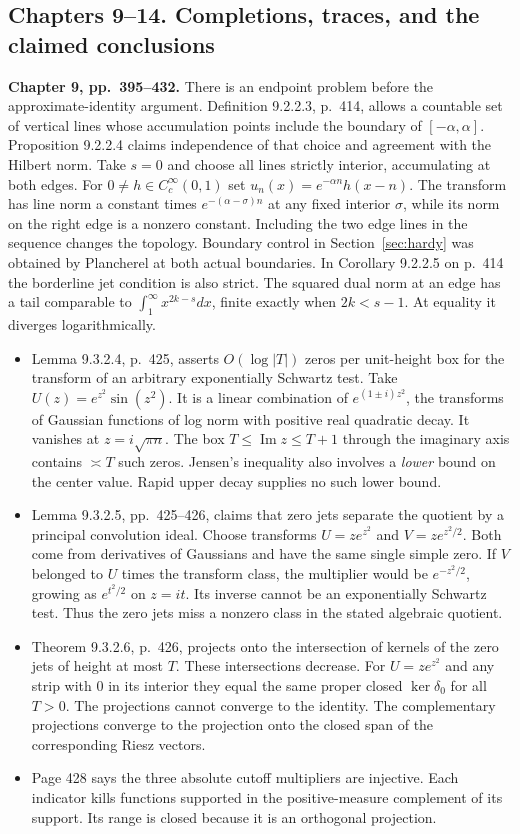 \documentclass[11pt,letterpaper]{article}
\newcommand{\im}{\operatorname{Im}}
\newcommand{\head}[1]{\par\smallskip\textbf{#1}\enspace}
\begin{document}
\subsection*{Chapters 9--14. Completions, traces, and the claimed conclusions}

\head{Chapter 9, pp.~395--432.}
There is an endpoint problem before the approximate-identity argument. Definition 9.2.2.3, p.~414, allows a countable set of vertical lines whose accumulation points include the boundary of $[-\alpha,\alpha]$. Proposition 9.2.2.4 claims independence of that choice and agreement with the Hilbert norm. Take $s=0$ and choose all lines strictly interior, accumulating at both edges. For $0\ne h\in C_c^\infty(0,1)$ set $u_n(x)=e^{-\alpha n}h(x-n)$. The transform has line norm a constant times $e^{-(\alpha-\sigma)n}$ at any fixed interior $\sigma$, while its norm on the right edge is a nonzero constant. Including the two edge lines in the sequence changes the topology. Boundary control in Section~\ref{sec:hardy} was obtained by Plancherel at both actual boundaries. In Corollary 9.2.2.5 on p.~414 the borderline jet condition is also strict. The squared dual norm at an edge has a tail comparable to $\int_1^\infty x^{2k-s}dx$, finite exactly when $2k<s-1$. At equality it diverges logarithmically.

\begin{itemize}[itemsep=3pt]
\item Lemma 9.3.2.4, p.~425, asserts $O(\log |T|)$ zeros per unit-height box for the transform of an arbitrary exponentially Schwartz test. Take $U(z)=e^{z^2}\sin(z^2)$. It is a linear combination of $e^{(1\pm i)z^2}$, the transforms of Gaussian functions of log norm with positive real quadratic decay. It vanishes at $z=i\sqrt{\pi n}$. The box $T\le\im z\le T+1$ through the imaginary axis contains $\asymp T$ such zeros. Jensen's inequality also involves a \emph{lower} bound on the center value. Rapid upper decay supplies no such lower bound.
\item Lemma 9.3.2.5, pp.~425--426, claims that zero jets separate the quotient by a principal convolution ideal. Choose transforms $U=z e^{z^2}$ and $V=z e^{z^2/2}$. Both come from derivatives of Gaussians and have the same single simple zero. If $V$ belonged to $U$ times the transform class, the multiplier would be $e^{-z^2/2}$, growing as $e^{t^2/2}$ on $z=it$. Its inverse cannot be an exponentially Schwartz test. Thus the zero jets miss a nonzero class in the stated algebraic quotient.
\item Theorem 9.3.2.6, p.~426, projects onto the intersection of kernels of the zero jets of height at most $T$. These intersections decrease. For $U=z e^{z^2}$ and any strip with $0$ in its interior they equal the same proper closed $\ker\delta_0$ for all $T>0$. The projections cannot converge to the identity. The complementary projections converge to the projection onto the closed span of the corresponding Riesz vectors.
\item Page 428 says the three absolute cutoff multipliers are injective. Each indicator kills functions supported in the positive-measure complement of its support. Its range is closed because it is an orthogonal projection.
\end{itemize}
\end{document}
